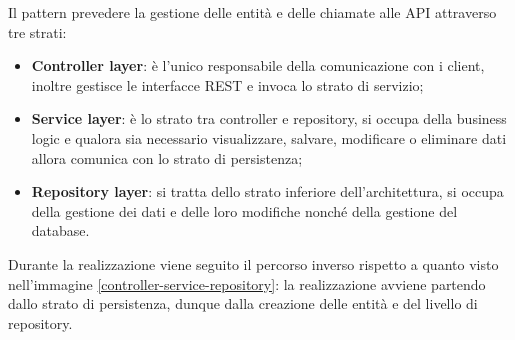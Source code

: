 \FloatBarrier
Il pattern prevedere la gestione delle entità e delle chiamate alle API attraverso tre strati:
\begin{itemize}
  \item \textbf{Controller layer}: è l'unico responsabile della comunicazione con i client, inoltre gestisce le interfacce REST e invoca lo strato di servizio;
  \item \textbf{Service layer}: è lo strato tra controller e repository, si occupa della business logic e qualora sia necessario visualizzare, salvare, modificare o eliminare dati allora comunica con lo strato di persistenza;
  \item \textbf{Repository layer}: si tratta dello strato inferiore dell'architettura, si occupa della gestione dei dati e delle loro modifiche nonché della gestione del database.
\end{itemize}
Durante la realizzazione viene seguito il percorso inverso rispetto a quanto visto nell'immagine \ref{controller-service-repository}: la realizzazione avviene partendo dallo strato di persistenza, dunque dalla creazione delle entità e del livello di repository.
